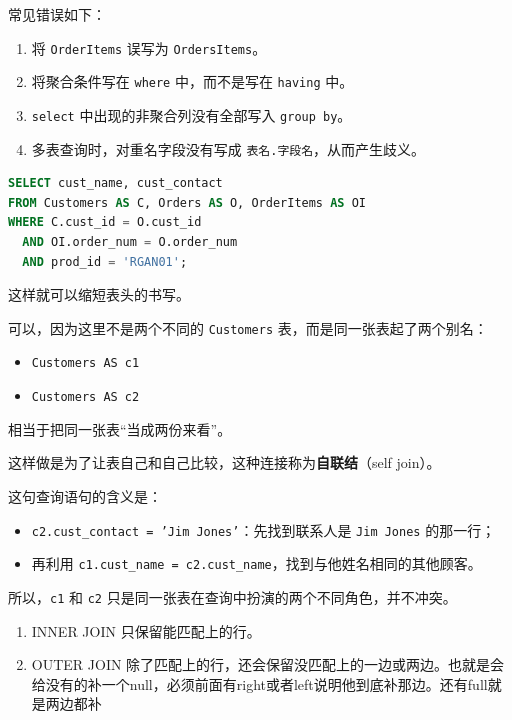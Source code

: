 \begin{example}
\begin{example}
常见错误如下：
\begin{enumerate}
    \item 将 \texttt{OrderItems} 误写为 \texttt{OrdersItems}。
    \item 将聚合条件写在 \texttt{where} 中，而不是写在 \texttt{having} 中。
    \item \texttt{select} 中出现的非聚合列没有全部写入 \texttt{group by}。
    \item 多表查询时，对重名字段没有写成 \texttt{表名.字段名}，从而产生歧义。
\end{enumerate}
\end{example}
\begin{lstlisting}[language=SQL]
SELECT cust_name, cust_contact
FROM Customers AS C, Orders AS O, OrderItems AS OI
WHERE C.cust_id = O.cust_id
  AND OI.order_num = O.order_num
  AND prod_id = 'RGAN01';
\end{lstlisting}
这样就可以缩短表头的书写。
\begin{note}[自联结]
    可以，因为这里不是两个不同的 \texttt{Customers} 表，而是同一张表起了两个别名：
\begin{itemize}
    \item \texttt{Customers AS c1}
    \item \texttt{Customers AS c2}
\end{itemize}

相当于把同一张表“当成两份来看”。

这样做是为了让表自己和自己比较，这种连接称为\textbf{自联结}（self join）。

这句查询语句的含义是：
\begin{itemize}
    \item \texttt{c2.cust\_contact = 'Jim Jones'}：先找到联系人是 \texttt{Jim Jones} 的那一行；
    \item 再利用 \texttt{c1.cust\_name = c2.cust\_name}，找到与他姓名相同的其他顾客。
\end{itemize}

所以，\texttt{c1} 和 \texttt{c2} 只是同一张表在查询中扮演的两个不同角色，并不冲突。
\end{note}
\begin{note}
 \begin{enumerate}
     \item   INNER JOIN 只保留能匹配上的行。
     \item OUTER JOIN 除了匹配上的行，还会保留没匹配上的一边或两边。也就是会给没有的补一个null，必须前面有right或者left说明他到底补那边。还有full就是两边都补
 \end{enumerate}  
  


\end{note}
\end{example}
